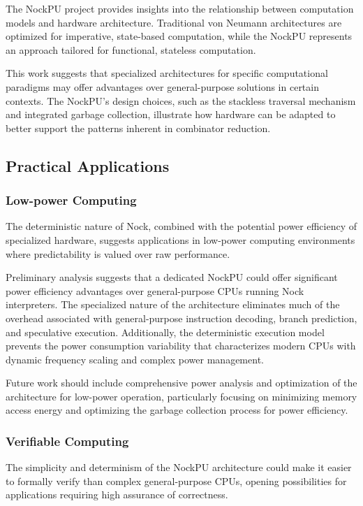 \documentclass[twoside]{article}
\begin{document}
The NockPU project provides insights into the relationship between computation models and hardware architecture. Traditional von Neumann architectures are optimized for imperative, state-based computation, while the NockPU represents an approach tailored for functional, stateless computation.

This work suggests that specialized architectures for specific computational paradigms may offer advantages over general-purpose solutions in certain contexts. The NockPU's design choices, such as the stackless traversal mechanism and integrated garbage collection, illustrate how hardware can be adapted to better support the patterns inherent in combinator reduction.

\subsection{Practical Applications}

\subsubsection{Low-power Computing}

The deterministic nature of Nock, combined with the potential power efficiency of specialized hardware, suggests applications in low-power computing environments where predictability is valued over raw performance.

Preliminary analysis suggests that a dedicated NockPU could offer significant power efficiency advantages over general-purpose CPUs running Nock interpreters. The specialized nature of the architecture eliminates much of the overhead associated with general-purpose instruction decoding, branch prediction, and speculative execution. Additionally, the deterministic execution model prevents the power consumption variability that characterizes modern CPUs with dynamic frequency scaling and complex power management.

Future work should include comprehensive power analysis and optimization of the architecture for low-power operation, particularly focusing on minimizing memory access energy and optimizing the garbage collection process for power efficiency.

\subsubsection{Verifiable Computing}

The simplicity and determinism of the NockPU architecture could make it easier to formally verify than complex general-purpose CPUs, opening possibilities for applications requiring high assurance of correctness.
\end{document}
